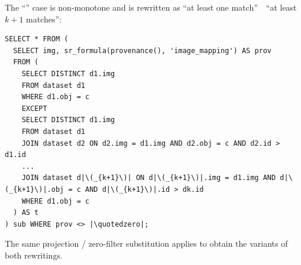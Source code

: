 \begin{toappendix}
The ``'' case is non-monotone and is rewritten as
``at least one match''~~``at least~$k+1$ matches'':
\begin{verbatim}
SELECT * FROM (
  SELECT img, sr_formula(provenance(), 'image_mapping') AS prov
  FROM (
    SELECT DISTINCT d1.img
    FROM dataset d1
    WHERE d1.obj = c
    EXCEPT
    SELECT DISTINCT d1.img
    FROM dataset d1
    JOIN dataset d2 ON d2.img = d1.img AND d2.obj = c AND d2.id > d1.id
    ...
    JOIN dataset d|\(_{k+1}\)| ON d|\(_{k+1}\)|.img = d1.img AND d|\(_{k+1}\)|.obj = c AND d|\(_{k+1}\)|.id > dk.id
    WHERE d1.obj = c
  ) AS t
) sub WHERE prov <> |\quotedzero|;
\end{verbatim}
The same projection / zero-filter substitution applies to obtain the
 variants of both  rewritings.
\end{toappendix}

